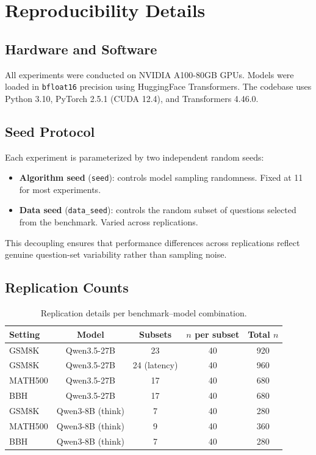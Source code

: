 \section{Reproducibility Details}
\label{app:reproducibility}

\subsection{Hardware and Software}
All experiments were conducted on NVIDIA A100-80GB GPUs.
Models were loaded in \texttt{bfloat16} precision using HuggingFace Transformers.
The codebase uses Python 3.10, PyTorch 2.5.1 (CUDA 12.4), and Transformers 4.46.0.

\subsection{Seed Protocol}
Each experiment is parameterized by two independent random seeds:
\begin{itemize}[nosep,leftmargin=*]
    \item \textbf{Algorithm seed} (\texttt{seed}): controls model sampling randomness. Fixed at 11 for most experiments.
    \item \textbf{Data seed} (\texttt{data\_seed}): controls the random subset of questions selected from the benchmark. Varied across replications.
\end{itemize}
This decoupling ensures that performance differences across replications reflect genuine question-set variability rather than sampling noise.

\subsection{Replication Counts}

\begin{table}[h]
\centering
\caption{Replication details per benchmark--model combination.}
\small
\begin{tabular}{@{}lcccc@{}}
\toprule
\textbf{Setting} & \textbf{Model} & \textbf{Subsets} & $n$ \textbf{per subset} & \textbf{Total} $n$ \\
\midrule
GSM8K & Qwen3.5-27B & 23 & 40 & 920 \\
GSM8K & Qwen3.5-27B & 24 (latency) & 40 & 960 \\
MATH500 & Qwen3.5-27B & 17 & 40 & 680 \\
BBH & Qwen3.5-27B & 17 & 40 & 680 \\
GSM8K & Qwen3-8B (think) & 7 & 40 & 280 \\
MATH500 & Qwen3-8B (think) & 9 & 40 & 360 \\
BBH & Qwen3-8B (think) & 7 & 40 & 280 \\
\bottomrule
\end{tabular}
\end{table}


